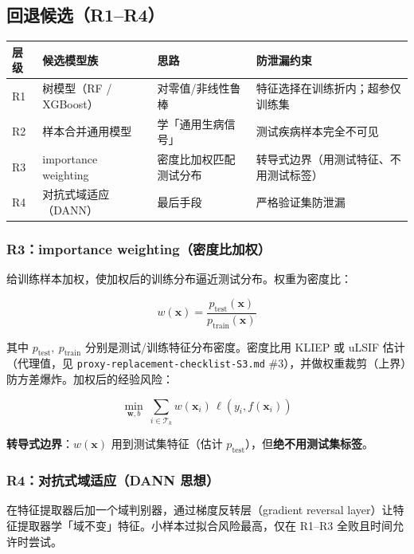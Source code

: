 \documentclass{internal-report}
\begin{document}
\subsection{回退候选（R1--R4）}

\begin{center}
\begin{tabular}{lp{}p{}p{}}
\toprule
层级 & 候选模型族 & 思路 & 防泄漏约束 \\
\midrule
R1 & 树模型（RF / XGBoost） & 对零值/非线性鲁棒 & 特征选择在训练折内；超参仅训练集 \\
R2 & 样本合并通用模型 & 学「通用生病信号」 & 测试疾病样本完全不可见 \\
R3 & importance weighting & 密度比加权匹配测试分布 & 转导式边界（用测试特征、不用测试标签） \\
R4 & 对抗式域适应（DANN） & 最后手段 & 严格验证集防泄漏 \\
\bottomrule
\end{tabular}
\end{center}

\subsubsection{R3：importance weighting（密度比加权）}

给训练样本加权，使加权后的训练分布逼近测试分布。权重为密度比：

$$
w(\mathbf{x}) = \frac{p_{\text{test}}(\mathbf{x})}{p_{\text{train}}(\mathbf{x})}
$$

其中 $p_{\text{test}},\ p_{\text{train}}$ 分别是测试/训练特征分布密度。密度比用 KLIEP 或 uLSIF 估计（代理值，见 \texttt{proxy-replacement-checklist-S3.md} \#3），并做权重裁剪（上界）防方差爆炸。加权后的经验风险：

$$
\min_{\mathbf{w},b}\ \sum_{i\in\mathcal{T}_k} w(\mathbf{x}_i)\, \ell\!\left(y_i, f(\mathbf{x}_i)\right)
$$

\textbf{转导式边界}：$w(\mathbf{x})$ 用到测试集特征（估计 $p_{\text{test}}$），但\textbf{绝不用测试集标签}。

\subsubsection{R4：对抗式域适应（DANN 思想）}

在特征提取器后加一个域判别器，通过梯度反转层（gradient reversal layer）让特征提取器学「域不变」特征。小样本过拟合风险最高，仅在 R1--R3 全败且时间允许时尝试。
\end{document}
